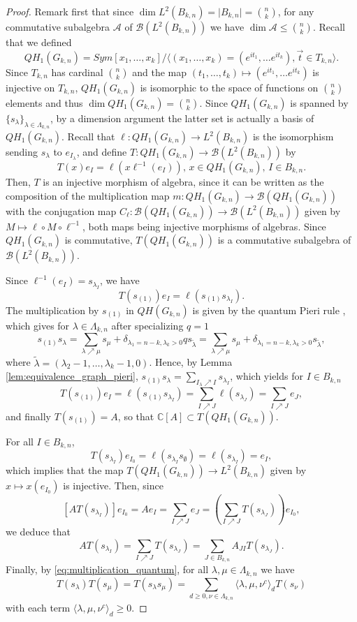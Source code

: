 \documentclass[10pt,11pt]{amsart}%
\begin{document}
\begin{proof}
Remark first that since $\dim L^2(B_{k,n})=\vert B_{k,n}\vert=\binom nk$, for any commutative subalgebra $\mathcal{A}$ of $\mathcal{B}(L^2(B_{k,n}))$ we have $\dim \mathcal{A}\leq \binom nk$. Recall that we defined 
$$QH_1(G_{k,n})=Sym[x_1,\ldots,x_k]/\langle (x_1,\ldots,x_k)=\left(e^{it_1},\ldots e^{it_k}\right), \vec{t}\in T_{k,n}\rangle.$$
Since $T_{k,n}$ has cardinal $\binom nk$ and the map $(t_1,\ldots,t_k)\mapsto\left(e^{it_1},\ldots e^{it_k}\right)$ is injective on $T_{k,n}$, $QH_1(G_{k,n})$ is isomorphic to the space of functions on $\binom nk$ elements and thus $\dim QH_1(G_{k,n})=\binom nk$. Since $QH_1(G_{k,n})$ is spanned by $\{s_{\lambda}\}_{\lambda\in \Lambda_{k,n}}$, by a dimension argument the latter set is actually a basis of $QH_1(G_{k,n})$. Recall that $\ell:QH_1(G_{k,n})\rightarrow L^2(B_{k,n})$ is the isomorphism sending $s_\lambda$ to $e_{I_{\lambda}}$, and define $T:QH_1(G_{k,n})\rightarrow \mathcal{B}(L^2(B_{k,n}))$ by
$$T(x)e_{I}=\ell(x\ell^{-1}(e_I)),\,x\in QH_1(G_{k,n}),\,  I\in B_{k,n}.$$
Then, $T$ is an injective morphism of algebra, since it can be written as the composition of the multiplication map $m:QH_1(G_{k,n})\rightarrow \mathcal{B}(QH_1(G_{k,n}))$ with the conjugation map $C_{\ell}:\mathcal{B}(QH_1(G_{k,n}))\rightarrow \mathcal{B}(L^2(B_{k,n}))$ given by $M\mapsto \ell\circ M\circ \ell^{-1}$, both maps being injective morphisms of algebras. Since $QH_{1}(G_{k,n})$ is commutative, $T(QH_{1}(G_{k,n}))$ is a commutative subalgebra of $\mathcal{B}(L^2(B_{k,n}))$.

Since $\ell^{-1}(e_{I})=s_{\lambda_I}$, we have
$$T(s_{(1)})e_{I}=\ell(s_{(1)}s_{\lambda_{I}}).$$
The multiplication by $s_{(1)}$ in $QH(G_{k,n})$ is given by the quantum Pieri rule \cite[Eq. (22)]{BCF}, which gives for $\lambda\in \Lambda_{k,n}$ after specializing $q=1$
$$s_{(1)}s_{\lambda}=\sum_{\lambda\nearrow \mu}s_{\mu}+\delta_{\lambda_1=n-k,\lambda_k>0}qs_{\tilde{\lambda}}=\sum_{\lambda\nearrow \mu}s_{\mu}+\delta_{\lambda_1=n-k,\lambda_k>0}s_{\tilde{\lambda}},$$
where $\tilde{\lambda}=(\lambda_2-1,\ldots,\lambda_k-1,0)$. Hence, by Lemma \ref{lem:equivalence_graph_pieri}, $s_{(1)}s_{\lambda}=\sum_{I_{\lambda}\nearrow I}s_{\lambda_{I}}$, which yields for $I\in B_{k,n}$
$$T(s_{(1)})e_{I}=\ell(s_{(1)}s_{\lambda_{I}})=\sum_{I\nearrow J}\ell(s_{\lambda_{J}})=\sum_{I\nearrow J}e_{J},$$
and finally $T(s_{(1)})=A$, so that $\mathbb{C}[A]\subset T(QH_{1}(G_{k,n}))$.

For all $I\in B_{k,n}$,
$$T(s_{\lambda_I})e_{I_0}=\ell(s_{\lambda_I}s_{\emptyset})=\ell(s_{\lambda_I})=e_{I},$$
which implies that the map $T(QH_{1}(G_{k,n}))\rightarrow L^2(B_{k,n})$ given by $x\mapsto x(e_{I_0})$ is injective. Then, since $$\left[AT(s_{\lambda_I})\right]e_{I_0}=Ae_{I}=\sum_{I\nearrow J}e_{J}=\left(\sum_{I\nearrow J} T(s_{\lambda_J})\right)e_{I_0},$$
we deduce that 
$$AT(s_{\lambda_I})=\sum_{I\nearrow J} T(s_{\lambda_J})=\sum_{J\in B_{k,n}}A_{JI} T(s_{\lambda_J}).$$
Finally, by \eqref{eq:multiplication_quantum}, for all $\lambda,\mu \in \Lambda_{k,n}$ we have 
$$T(s_{\lambda})T(s_{\mu})=T(s_{\lambda}s_{\mu})=\sum_{d\geq 0,\nu\in \Lambda_{k,n}}\langle\lambda,\mu,\nu^c\rangle_dT(s_{\nu})$$
with each term $\langle\lambda,\mu,\nu^c\rangle_d\geq 0$. 



\end{proof}
\end{document}
